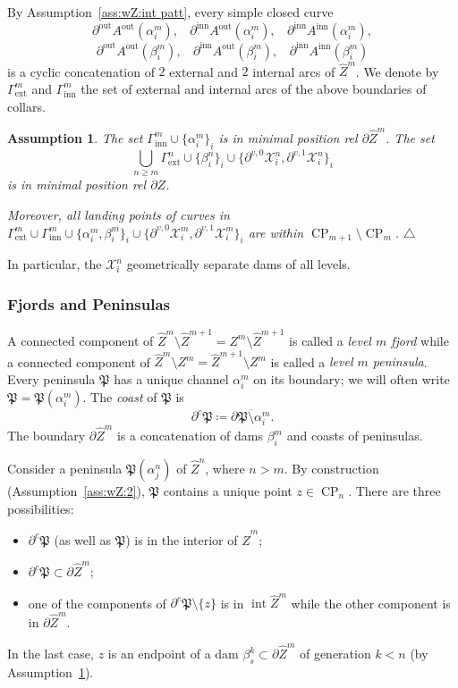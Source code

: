 \documentclass{amsart}
\newcommand\xqed[1]{%
  \leavevmode\unskip\penalty9999 \hbox{}\nobreak\hfill
  \quad\hbox{#1}}
\newcommand\tqed{\xqed{$\triangle$}}
\renewcommand{\sp}{{\ \ }}
\newcommand{\1}{{\mathbb 1 }}
\newcommand{\ext}{{\operatorname{ext}}}
\newcommand\XX{\mathcal{X}}
\newcommand\intr{\operatorname{int}}
\newcommand{\wZ}{{\widehat Z}}
\newcommand\inn{{\operatorname{inn}}}
\newcommand\out{{\operatorname{out}}}
\newtheorem{assum}{Assumption}
\theoremstyle{remark}
\numberwithin{equation}{section}
\theoremstyle{definition}
\newcommand{\Penin}{{\mathfrak P}}
\newcommand{\CP}{{\operatorname{CP}}}
\begin{document}
By Assumption~\ref{ass:wZ:int patt}, every simple closed curve
\[ \partial^\out A^\out(\alpha^m_i),\sp\sp \partial^\inn A^\out(\alpha^m_i),\sp\sp  \partial^\inn A^\inn(\alpha^m_i), \]
\[ \partial^\out A^\out(\beta^m_i),\sp\sp \partial^\inn A^\out(\beta^m_i),\sp\sp  \partial^\inn A^\inn(\beta^m_i) \]
is a cyclic concatenation of $2$ external and $2$ internal arcs of $\wZ^m$. We denote by $\Gamma^m_\ext$ and $\Gamma^m_\inn$ the set of external and internal arcs of the above boundaries of collars.


 \begin{assum}
\label{ass:wZ:Linking}
The set $\Gamma^m_\inn\cup \{\alpha^m_i\}_i $ is in minimal position rel $\partial \wZ^m$. The set
 \[  \bigcup_{n\ge m} \Gamma^n_\ext\cup \{\beta^n_i\}_i\cup \{ \partial^{v, 0}\XX^n_i, \partial^{v,1}\XX^n_i \}_i\] 
 is in minimal position rel $\partial Z$.
 
 Moreover, all landing points of curves in $\Gamma^m_\ext\cup \Gamma^m_\inn \cup \{\alpha^m_i, \beta^m_i\}_i\cup \{ \partial^{v, 0}\XX^m_i, \partial^{v,1}\XX^m_i \}_i$ are within $\CP_{m+1}\setminus \CP_m$.
 \tqed
\end{assum}

In particular, the $\XX^n_i$ geometrically separate dams of all levels.

\subsubsection{Fjords and Peninsulas}\label{sss:Fjord Penin} A connected component of $\wZ^m\setminus \wZ^{m+1}=Z^m\setminus \wZ^{m+1}$ is called a \emph{level $m$ fjord} while a connected component of $\wZ^{m}\setminus Z^m=\wZ^{m+1}\setminus Z^m$ is called a \emph{level $m$ peninsula}. Every peninsula $\Penin$ has a unique channel $\alpha_i^m$ on its boundary; we will often write $\Penin=\Penin(\alpha^m_i)$. The \emph{coast} of $\Penin$ is \[\partial^c \Penin\coloneqq \overline{ \partial \Penin\setminus \alpha^m_i}.\] The boundary $\partial \wZ^m$ is a concatenation of dams $\beta^m_i$ and coasts of peninsulas.



 Consider a peninsula $\Penin(\alpha^n_j)$ of $\wZ^n$, where $n>m$. By construction (Assumption~\ref{ass:wZ:2}), $\Penin$ contains a unique point $z\in \CP_n$. There are three possibilities:
\begin{itemize}
 \item $\partial^c \Penin$ (as well as $\Penin$) is in the interior of $\wZ^m$;
 \item $\partial^c \Penin\subset \partial \wZ^m$;
 \item one of the components of $\partial^c \Penin\setminus \{z\}$ is in $\intr\wZ^m$ while the other component is in $\partial \wZ^m$.
\end{itemize}
  In the last case, $z$ is an endpoint of a dam $\beta^k_s\subset \partial \wZ^m$ of generation $k<n$ (by Assumption~\ref{ass:wZ:Linking}).
 
\end{document}

